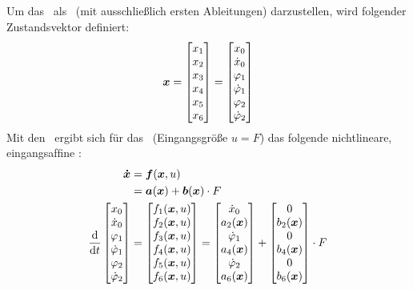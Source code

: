 \subsection{\zrm}\label{subsec:zrm}

Um das \spds\ als \zrm\ (mit ausschließlich ersten Ableitungen) darzustellen, wird folgender Zustandsvektor definiert:
\begin{align}
	\boldsymbol{x} = \begin{bmatrix}
		x_1 \\	x_2 \\	x_3 \\	x_4 \\	x_5 \\	x_6 \\	
	\end{bmatrix} = \begin{bmatrix}
		x_0 \\ \dot{x}_0 \\ \varphi_1 \\ \dot{\varphi}_1 \\ \varphi_2 \\ \dot{\varphi}_2
	\end{bmatrix}
	\label{eq:vex}
\end{align}
Mit den \bwgl\ ergibt sich für das \krs\ (Eingangsgröße $u=F$) das folgende nichtlineare, eingangsafﬁne \zrm:
\begin{align}
	\vexp &= \ve{f}(\vex,u)  \\
		&= \ve{a}(\vex) + \ve{b}(\vex) \cdot F  
		\label{eq:zrm} 
		\\\vspace{100cm}
	\ddt \begin{bmatrix}
		\xo \\ \xop \\ \phe \\ \phep \\ \phz \\ \phzp
	\end{bmatrix} &= \begin{bmatrix}
		f_1(\vex,u) \\ f_2(\vex,u) \\  f_3(\vex,u) \\  f_4(\vex,u) \\  f_5(\vex,u) \\  f_6(\vex,u)
	\end{bmatrix}= \begin{bmatrix}
		\xop \\ a_2(\vex) \\ \phep \\  a_4(\vex) \\ \phzp \\  a_6(\vex)
	\end{bmatrix} + \begin{bmatrix}
		0 \\ b_2(\vex) \\ 0 \\  b_4(\vex) \\ 0 \\  b_6(\vex)
	\end{bmatrix} \cdot F
	\label{eq:zrmF}
\end{align}

